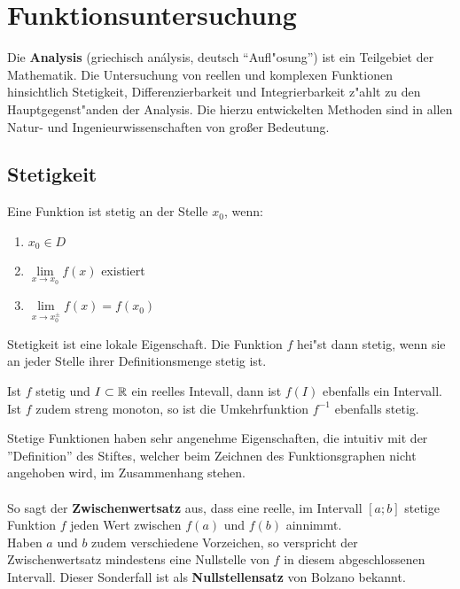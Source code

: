 \chapter{Funktionsuntersuchung}

Die \textbf{Analysis} (griechisch  análysis, deutsch "`Aufl"osung"') ist ein Teilgebiet der Mathematik.  Die Untersuchung von reellen und komplexen Funktionen hinsichtlich Stetigkeit, Differenzierbarkeit und Integrierbarkeit z"ahlt zu den Hauptgegenst"anden der Analysis. Die hierzu entwickelten Methoden sind in allen Natur- und Ingenieurwissenschaften von großer Bedeutung.\\

\section{Stetigkeit}

\begin{Definition}
Eine Funktion ist stetig an der Stelle $x_{0}$, wenn:
\begin{enumerate}
\item $x_{0}\in D$
\item $\lim\limits_{x \rightarrow x_{0}} {f(x)}$ existiert
\item $\lim\limits_{x \rightarrow x_{0}^{\pm}} {f(x)}=f(x_{0})$\\
\end{enumerate}
\end{Definition}
Stetigkeit ist eine lokale Eigenschaft. Die Funktion $f$ hei"st dann stetig, wenn sie an jeder Stelle ihrer Definitionsmenge stetig ist.

\begin{Bemerkung}
Ist $f$ stetig und $I\subset \mathbb{R}$ ein reelles Intevall, dann ist $f(I)$ ebenfalls ein Intervall. Ist $f$ zudem streng monoton, so ist die Umkehrfunktion $f^{-1}$ ebenfalls stetig.
\end{Bemerkung}

\begin{Bemerkung}
Stetige Funktionen haben sehr angenehme Eigenschaften, die intuitiv mit der ''Definition'' des Stiftes, welcher beim Zeichnen des Funktionsgraphen nicht angehoben wird, im Zusammenhang stehen.\\
\\
So sagt der \textbf{Zwischenwertsatz} aus, dass eine reelle, im Intervall $[a;b]$ stetige Funktion $f$ jeden Wert zwischen $f(a)$ und $f(b)$ ainnimmt.\\
Haben $a$ und $b$ zudem verschiedene Vorzeichen, so verspricht der Zwischenwertsatz mindestens eine Nullstelle von $f$ in diesem abgeschlossenen Intervall. Dieser Sonderfall ist als \textbf{Nullstellensatz} von Bolzano bekannt.
\end{Bemerkung}

